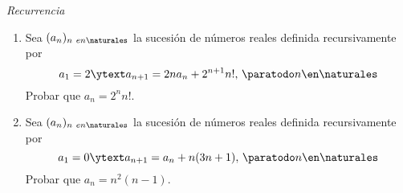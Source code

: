 \separador

\textit{Recurrencia}

\begin{enunciado}{\ejercicio}
  \begin{enumerate}[label=\roman*)]
    \item
          Sea $(a_n)_{n\ en \naturales}$ la sucesión de números reales definida recursivamente por
          $$
            a_1 = 2 \ytext a_{n+1} = 2 n a_n+ 2^{n+1}n!,\, \paratodo n \en \naturales
          $$
          Probar que $a_n = 2^n n!$.

    \item
          Sea $(a_n)_{n\ en \naturales}$ la sucesión de números reales definida recursivamente por
          $$
            a_1 = 0 \ytext a_{n+1} = a_n + n(3n + 1),\, \paratodo n \en \naturales
          $$
          Probar que $a_n = n^2 (n-1)$.
  \end{enumerate}
\end{enunciado}

